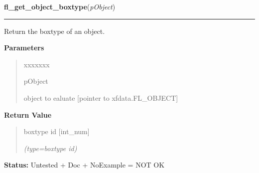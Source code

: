 \hspace{.8\funcindent}\begin{boxedminipage}{\funcwidth}

    \raggedright \textbf{fl\_get\_object\_boxtype}(\textit{pObject})

    \vspace{-1.5ex}

    \rule{\textwidth}{0.5\fboxrule}
\setlength{\parskip}{2ex}
    Return the boxtype of an object.

\setlength{\parskip}{1ex}
      \textbf{Parameters}
      \vspace{-1ex}

      \begin{quote}
        \begin{Ventry}{xxxxxxx}

          \item[pObject]

          object to ealuate [pointer to xfdata.FL\_OBJECT]

        \end{Ventry}

      \end{quote}

      \textbf{Return Value}
    \vspace{-1ex}

      \begin{quote}
      boxtype id [int\_num]

      {\it (type=boxtype id)}

      \end{quote}

\textbf{Status:} Untested + Doc + NoExample = NOT OK



    \end{boxedminipage}

    \label{xformslib:library:fl_set_object_bw}

    \vspace{0.5ex}

